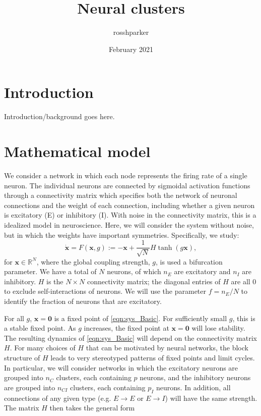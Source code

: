 \documentclass[11pt,reqno]{amsart}
\title{Neural clusters}
\author{rosshparker }
\date{February 2021}
\newcommand{\xvec}{\mathbf{x}}
\newcommand{\Zerovec}{\mathbf{0}}
\newcommand{\R}{\mathbb{R}}
\begin{document}
\setcounter{tocdepth}{3}
\tableofcontents

\section{Introduction}

Introduction/background goes here.

\section{Mathematical model}

We consider a network in which each node represents the firing rate of a single neuron. The individual neurons are connected by sigmoidal activation functions through a connectivity matrix which specifies both the network of neuronal connections and the weight of each connection, including whether a given neuron is excitatory (E) or inhibitory (I). With noise in the connectivity matrix, this is a idealized model in neuroscience. Here, we will consider the system without noise, but in which the weights have important symmetries. Specifically, we study:
\begin{equation}\label{eqn:sys_Basic}
    \dot{\xvec} = 
    F(\xvec, g) := -\xvec  + \frac{1}{\sqrt{N}} H\tanh (g \xvec),
\end{equation}
for $\xvec \in \R^N$, where the global coupling strength, $g$, is used a bifurcation parameter. We have a total of $N$ neurons, of which $n_E$ are excitatory and $n_I$ are inhibitory. $H$ is the $N \times N$ connectivity matrix; the diagonal entries of $H$ are all 0 to exclude self-interactions of neurons. We will use the parameter $f = n_E / N$ to identify the fraction of neurons that are excitatory.

For all $g$, $\xvec = \Zerovec$ is a fixed point of \cref{eqn:sys_Basic}. For sufficiently small $g$, this is a stable fixed point. As $g$ increases, the fixed point at $\xvec = \Zerovec$ will lose stability. The resulting dynamics of \cref{eqn:sys_Basic} will depend on the connectivity matrix $H$. For many choices of $H$ that can be motivated by neural networks, the block structure of $H$ leads to very stereotyped patterns of fixed points and limit cycles. In particular, we will consider networks in which the excitatory neurons are grouped into $n_C$ clusters, each containing $p$ neurons, and the inhibitory neurons are grouped into $n_{CI}$ clusters, each containing $p_I$ neurons. In addition, all connections of any given type (e.g. $E \rightarrow E$ or $E \rightarrow I$) will have the same strength. The matrix $H$ then takes the general form
\end{document}

